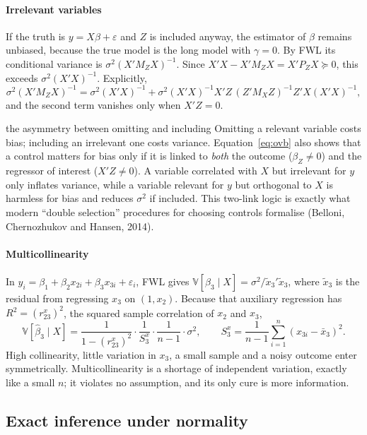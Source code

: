 \documentclass[11pt,a4paper]{article}
\newcommand{\V}{\mathbb{V}}
\newcommand{\bh}{\hat\beta}
\begin{document}
\paragraph{Irrelevant variables}
If the truth is $y=X\beta+\varepsilon$ and $Z$ is included anyway, the estimator of $\beta$ remains unbiased, because the true model is the long model with $\gamma=0$. By FWL its conditional variance is $\sigma^2(X'M_ZX)^{-1}$. Since $X'X-X'M_ZX=X'P_ZX\succeq0$, this exceeds $\sigma^2(X'X)^{-1}$. Explicitly,
\[
\sigma^2(X'M_ZX)^{-1}=\sigma^2(X'X)^{-1}+\sigma^2(X'X)^{-1}X'Z\,(Z'M_XZ)^{-1}Z'X(X'X)^{-1},
\]
and the second term vanishes only when $X'Z=0$.

\begin{whybox}{the asymmetry between omitting and including}
Omitting a relevant variable costs bias; including an irrelevant one costs variance. Equation~\eqref{eq:ovb} also shows that a control matters for bias only if it is linked to \emph{both} the outcome ($\beta_Z\neq0$) and the regressor of interest ($X'Z\neq0$). A variable correlated with $X$ but irrelevant for $y$ only inflates variance, while a variable relevant for $y$ but orthogonal to $X$ is harmless for bias and reduces $\sigma^2$ if included. This two-link logic is exactly what modern ``double selection'' procedures for choosing controls formalise (Belloni, Chernozhukov and Hansen, 2014).
\end{whybox}

\paragraph{Multicollinearity}
In $y_i=\beta_1+\beta_2x_{2i}+\beta_3x_{3i}+\varepsilon_i$, FWL gives $\V[\bh_3\mid X]=\sigma^2/\tilde x_3'\tilde x_3$, where $\tilde x_3$ is the residual from regressing $x_3$ on $(1,x_2)$. Because that auxiliary regression has $R^2=(r_{23}^x)^2$, the squared sample correlation of $x_2$ and $x_3$,
\begin{equation}\label{eq:mc}
\V[\bh_3\mid X] = \frac{1}{1-(r_{23}^x)^2}\cdot\frac{1}{S_3^x}\cdot\frac{1}{n-1}\cdot\sigma^2,\qquad S_3^x = \frac{1}{n-1}\sum_{i=1}^n(x_{3i}-\bar x_3)^2 .
\end{equation}
High collinearity, little variation in $x_3$, a small sample and a noisy outcome enter symmetrically. Multicollinearity is a shortage of independent variation, exactly like a small $n$; it violates no assumption, and its only cure is more information.

\subsection{Exact inference under normality}
\end{document}
